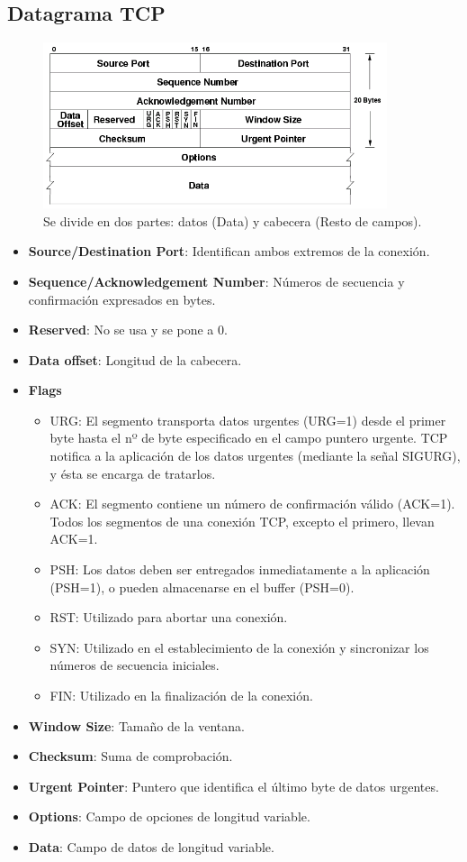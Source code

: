 \subsection{Datagrama TCP}
\begin{figure}[H]
    \centering
    \includegraphics[width=0.9\textwidth]{img/TCPformat.png}
    \caption{Se divide en dos partes: datos (Data) y cabecera (Resto de campos).}
\end{figure}
\begin{itemize}
    \item \textbf{Source/Destination Port}: Identifican ambos extremos de la conexión.
    \item \textbf{Sequence/Acknowledgement Number}: Números de secuencia y confirmación expresados en bytes.
    \item \textbf{Reserved}: No se usa y se pone a 0.
    \item \textbf{Data offset}: Longitud de la cabecera.
    \item \textbf{Flags}
    \begin{itemize}
        \item URG: El segmento transporta datos urgentes (URG=1) desde el primer byte hasta el nº de byte especificado en el campo puntero urgente. TCP notifica a la aplicación de los datos urgentes (mediante la señal SIGURG), y ésta se encarga de tratarlos.
        \item ACK: El segmento contiene un número de confirmación válido (ACK=1). Todos los segmentos de una conexión TCP, excepto el primero, llevan ACK=1.
        \item PSH: Los datos deben ser entregados inmediatamente a la aplicación (PSH=1), o pueden almacenarse en el buffer (PSH=0).
        \item RST: Utilizado para abortar una conexión.
        \item SYN: Utilizado en el establecimiento de la conexión y sincronizar los números de
secuencia iniciales.
        \item FIN: Utilizado en la finalización de la conexión.
    \end{itemize}
    \item \textbf{Window Size}: Tamaño de la ventana.
    \item \textbf{Checksum}: Suma de comprobación.
    \item \textbf{Urgent Pointer}: Puntero que identifica el último byte de datos urgentes.
    \item \textbf{Options}: Campo de opciones de longitud variable.
    \item \textbf{Data}: Campo de datos de longitud variable.
\end{itemize}
